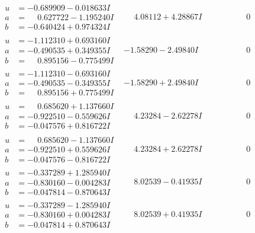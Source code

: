 \documentclass[1p]{elsarticle_modified}
\theoremstyle{definition}
\begin{document}
$$\begin{array}{c|c|c}
\begin{aligned}
u &= -0.689909 - 0.018633 I \\
a &= \phantom{-}0.627722 - 1.195240 I \\
b &= -0.640424 + 0.974324 I\end{aligned}
 & \phantom{-}4.08112 + 4.28867 I & \phantom{-0.000000 } 0 \\ \hline\begin{aligned}
u &= -1.112310 + 0.693160 I \\
a &= -0.490535 + 0.349355 I \\
b &= \phantom{-}0.895156 - 0.775499 I\end{aligned}
 & -1.58290 - 2.49840 I & \phantom{-0.000000 } 0 \\ \hline\begin{aligned}
u &= -1.112310 - 0.693160 I \\
a &= -0.490535 - 0.349355 I \\
b &= \phantom{-}0.895156 + 0.775499 I\end{aligned}
 & -1.58290 + 2.49840 I & \phantom{-0.000000 } 0 \\ \hline\begin{aligned}
u &= \phantom{-}0.685620 + 1.137660 I \\
a &= -0.922510 - 0.559626 I \\
b &= -0.047576 + 0.816722 I\end{aligned}
 & \phantom{-}4.23284 - 2.62278 I & \phantom{-0.000000 } 0 \\ \hline\begin{aligned}
u &= \phantom{-}0.685620 - 1.137660 I \\
a &= -0.922510 + 0.559626 I \\
b &= -0.047576 - 0.816722 I\end{aligned}
 & \phantom{-}4.23284 + 2.62278 I & \phantom{-0.000000 } 0 \\ \hline\begin{aligned}
u &= -0.337289 + 1.285940 I \\
a &= -0.830160 - 0.004283 I \\
b &= -0.047814 - 0.870643 I\end{aligned}
 & \phantom{-}8.02539 - 0.41935 I & \phantom{-0.000000 } 0 \\ \hline\begin{aligned}
u &= -0.337289 - 1.285940 I \\
a &= -0.830160 + 0.004283 I \\
b &= -0.047814 + 0.870643 I\end{aligned}
 & \phantom{-}8.02539 + 0.41935 I & \phantom{-0.000000 } 0 \\ \hline\begin{aligned}

\end{aligned}
\end{array}$$
\end{document}

